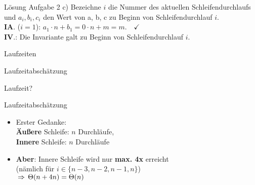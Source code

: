 \begin{frame}{Lösung Aufgabe 2 c)}
	Bezeichne $i$ die Nummer des aktuellen Schleifendurchlaufs und $a_i, b_i, c_i$ den Wert von a, b, c zu Beginn von Schleifendurchlauf $i$. \\
	\pause
	\hanging \textbf{IA}. ($i=1$): \quad $a_1 \cdot n + b_1 = 0 \cdot n + m = m. \quad \checkmark$ \\
	\pause
	\hanging \textbf{IV}.: Die Invariante galt zu Beginn von Schleifendurchlauf $i$. \\
	\pause
\end{frame}

\begin{headframe}
	Laufzeiten
\end{headframe}

\begin{frame}{Laufzeitabschätzung}
	\begin{exampleblock}{Laufzeit?}
		\begin{algorithm}[H]
		\end{algorithm}
	\end{exampleblock}
\end{frame}

\begin{frame}{Laufzeitabschätzung}
	\begin{itemize}
		\item Erster Gedanke: \\ 
		\textbf{Äußere} Schleife: $n$ Durchläufe, \\ 
		\textbf{Innere} Schleife: $n$ Durchläufe \\ 
		\only<1|handout:0>{$\impl \Theta(n \cdot n) = \Theta(n^2)$}
		\only<2>{$\xcancel{\impl \Theta(n \cdot n) = \Theta(n^2)}$}
		\pause
		\item \textbf{Aber}: Innere Schleife wird nur \textbf{max. 4x} erreicht \\ (nämlich für $i \in \{n-3, n-2, n-1, n\}$) \\
		$\impl \Theta(n + 4n) = \Theta(n)$
	\end{itemize}
\end{frame}


